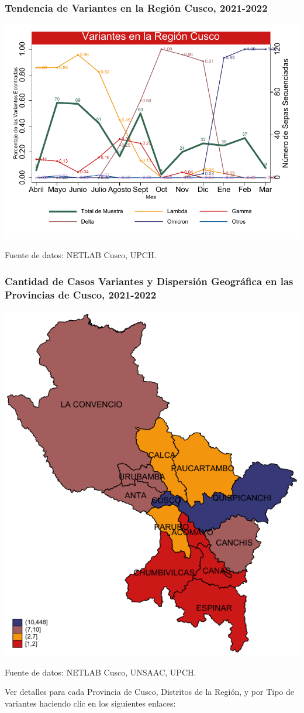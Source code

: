 \documentclass[xcolor=table]{beamer}
\begin{document}
\begin{frame}[label=variantes]
\frametitle{Tendencia de Variantes en la Región Cusco, 2021-2022}
\vspace{-.5cm}
\begin{center}
\includegraphics[width=0.9\linewidth]{../figuras/variantes.pdf}
\end{center}
{\tiny Fuente de datos: NETLAB Cusco, UPCH.}
\end{frame}

\begin{frame}[label=mapa_variantes]
\frametitle{Cantidad de Casos Variantes y Dispersión Geográfica en las Provincias de Cusco, 2021-2022}
\begin{center}
\includegraphics[width=0.4\linewidth]{../figuras/variantes_provincial.pdf}
\end{center}
{\tiny Fuente de datos: NETLAB Cusco, UNSAAC, UPCH.}
	
	Ver detalles para cada  Provincia de Cusco, Distritos de la Región, y por Tipo de variantes haciendo clic en los siguientes enlaces:
	\hyperlink{mapa_provincia_cusco}{} \hyperlink{mapa_distrital}{} \hyperlink{mapa_lambda}{}
	\hyperlink{mapa_gamma}{}
	\hyperlink{mapa_delta}{}
	\hyperlink{mapa_delta}{}
\end{frame}
\end{document}
